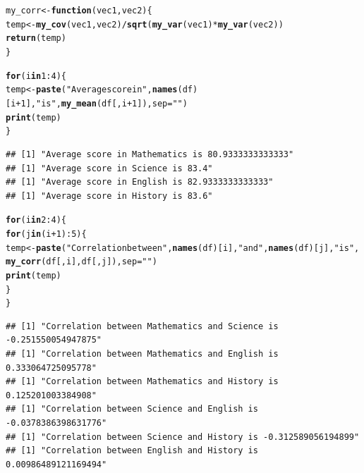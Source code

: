\documentclass[11pt, a4paper]{article}\usepackage[]{graphicx}\usepackage[]{xcolor}
\makeatletter
\newcommand{\hlnum}[1]{\textcolor[rgb]{0.686,0.059,0.569}{#1}}%
\newcommand{\hlsng}[1]{\textcolor[rgb]{0.192,0.494,0.8}{#1}}%
\newcommand{\hlopt}[1]{\textcolor[rgb]{0,0,0}{#1}}%
\newcommand{\hldef}[1]{\textcolor[rgb]{0.345,0.345,0.345}{#1}}%
\newcommand{\hlkwa}[1]{\textcolor[rgb]{0.161,0.373,0.58}{\textbf{#1}}}%
\newcommand{\hlkwb}[1]{\textcolor[rgb]{0.69,0.353,0.396}{#1}}%
\newcommand{\hlkwc}[1]{\textcolor[rgb]{0.333,0.667,0.333}{#1}}%
\newcommand{\hlkwd}[1]{\textcolor[rgb]{0.737,0.353,0.396}{\textbf{#1}}}%
\newenvironment{kframe}{%
 \def\at@end@of@kframe{}%
 \ifinner\ifhmode%
  \def\at@end@of@kframe{\end{minipage}}%
  \begin{minipage}{\columnwidth}%
 \fi\fi%
 \def\FrameCommand##1{\hskip\@totalleftmargin \hskip-\fboxsep
 \colorbox{shadecolor}{##1}\hskip-\fboxsep
     \hskip-\linewidth \hskip-\@totalleftmargin \hskip\columnwidth}%
 \MakeFramed {\advance\hsize-\width
   \@totalleftmargin\z@ \linewidth\hsize
   \@setminipage}}%
 {\par\unskip\endMakeFramed%
 \at@end@of@kframe}
\newenvironment{knitrout}{}{} %
\makeatother
\begin{document}
\begin{knitrout}
\color{fgcolor}\begin{kframe}
\begin{alltt}
\hldef{my_corr} \hlkwb{<-} \hlkwa{function}\hldef{(}\hlkwc{vec1}\hldef{,} \hlkwc{vec2}\hldef{)\{}
  \hldef{temp} \hlkwb{<-} \hlkwd{my_cov}\hldef{(vec1, vec2)} \hlopt{/} \hlkwd{sqrt}\hldef{(}\hlkwd{my_var}\hldef{(vec1)} \hlopt{*} \hlkwd{my_var}\hldef{(vec2))}
  \hlkwd{return}\hldef{(temp)}
\hldef{\}}
\end{alltt}
\end{kframe}
\end{knitrout}

\begin{knitrout}
\color{fgcolor}\begin{kframe}
\begin{alltt}
\hlkwa{for} \hldef{(i} \hlkwa{in} \hlnum{1}\hlopt{:}\hlnum{4}\hldef{) \{}
  \hldef{temp} \hlkwb{<-} \hlkwd{paste}\hldef{(}\hlsng{"Average score in"}\hldef{,} \hlkwd{names}\hldef{(df)[i}\hlopt{+}\hlnum{1}\hldef{],} \hlsng{"is"}\hldef{,} \hlkwd{my_mean}\hldef{(df[,i}\hlopt{+}\hlnum{1}\hldef{]),} \hlkwc{sep} \hldef{=} \hlsng{" "}\hldef{)}
  \hlkwd{print}\hldef{(temp)}
\hldef{\}}
\end{alltt}
\begin{verbatim}
## [1] "Average score in Mathematics is 80.9333333333333"
## [1] "Average score in Science is 83.4"
## [1] "Average score in English is 82.9333333333333"
## [1] "Average score in History is 83.6"
\end{verbatim}
\end{kframe}
\end{knitrout}

\begin{knitrout}
\color{fgcolor}\begin{kframe}
\begin{alltt}
\hlkwa{for} \hldef{(i} \hlkwa{in} \hlnum{2}\hlopt{:}\hlnum{4}\hldef{) \{}
  \hlkwa{for} \hldef{(j} \hlkwa{in} \hldef{(i}\hlopt{+}\hlnum{1}\hldef{)}\hlopt{:}\hlnum{5}\hldef{) \{}
    \hldef{temp} \hlkwb{<-} \hlkwd{paste}\hldef{(}\hlsng{"Correlation between"}\hldef{,} \hlkwd{names}\hldef{(df)[i],} \hlsng{"and"}\hldef{,} \hlkwd{names}\hldef{(df)[j],} \hlsng{"is"}\hldef{,}
                  \hlkwd{my_corr}\hldef{(df[,i], df[,j]),} \hlkwc{sep} \hldef{=} \hlsng{" "}\hldef{)}
    \hlkwd{print}\hldef{(temp)}
  \hldef{\}}
\hldef{\}}
\end{alltt}
\begin{verbatim}
## [1] "Correlation between Mathematics and Science is -0.251550054947875"
## [1] "Correlation between Mathematics and English is 0.333064725095778"
## [1] "Correlation between Mathematics and History is 0.125201003384908"
## [1] "Correlation between Science and English is -0.0378386398631776"
## [1] "Correlation between Science and History is -0.312589056194899"
## [1] "Correlation between English and History is 0.00986489121169494"
\end{verbatim}
\end{kframe}
\end{knitrout}
\end{document}
